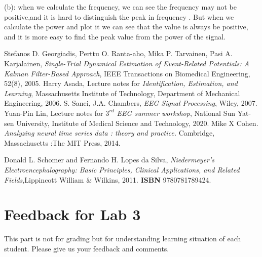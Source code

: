 \documentclass[a4 paper]{article}
\begin{document}
\begin{tcolorbox}[colback=YellowGreen!5!white,colframe=YellowGreen!75!black,title={Problem 12's answer}]
(b): when we calculate the frequency, we can see the frequency may not be positive,and it is hard to distinguish the peak in  frequency . But when we calculate the power and plot it we can see that the value is always be positive, and it is more easy to find the peak value from the power of the signal.
\end{tcolorbox}
\begin{thebibliography}{6}
Stefanos D. Georgiadis, Perttu O. Ranta-aho, Mika P. Tarvainen, Pasi A. Karjalainen, 
\textit{Single-Trial Dynamical Estimation of Event-Related Potentials: A Kalman Filter-Based Approach}, IEEE Transactions on Biomedical Engineering, 52(8), 2005.
Harry Asada, Lecture notes for \textit{Identification, Estimation, and Learning}, Massachusetts Institute of Technology, 
 Department of Mechanical Engineering, 2006.
S. Sanei, J.A. Chambers, \textit{EEG Signal Processing}, Wiley, 2007. 
Yuan-Pin Lin, Lecture notes for \textit{$3^{rd}$ EEG summer workshop}, National Sun Yat-sen University, Institute of Medical Science and Technology, 2020.
Mike X Cohen. \textit{Analyzing neural time series data : theory and practice.} Cambridge, Massachusetts :The MIT Press, 2014.


Donald L. Schomer and Fernando H. Lopes da Silva,
\textit{Niedermeyer's Electroencephalography: Basic Principles, Clinical Applications, and Related Fields},Lippincott William \& Wilkins, 2011. \textbf{ISBN} 9780781789424.

\end{thebibliography}
\newpage
\section{Feedback for Lab 3}
This part is not for grading but for understanding learning situation of each student. Please give us your feedback and comments.
\end{document}
